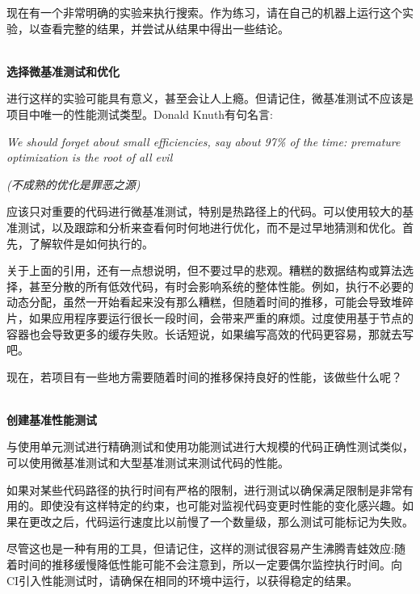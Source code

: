 现在有一个非常明确的实验来执行搜索。作为练习，请在自己的机器上运行这个实验，以查看完整的结果，并尝试从结果中得出一些结论。

\hspace*{\fill} \\ %
\noindent
\textbf{选择微基准测试和优化}

进行这样的实验可能具有意义，甚至会让人上瘾。但请记住，微基准测试不应该是项目中唯一的性能测试类型。Donald Knuth有句名言:

\begin{center}
\textit{We should forget about small efficiencies, say about 97\% of the time: premature optimization is the root of all evil}

\textit{(不成熟的优化是罪恶之源)}
\end{center}

应该只对重要的代码进行微基准测试，特别是热路径上的代码。可以使用较大的基准测试，以及跟踪和分析来查看何时何地进行优化，而不是过早地猜测和优化。首先，了解软件是如何执行的。

\begin{tcolorbox}[colback=blue!5!white,colframe=blue!75!black, title=Note]
\hspace*{0.7cm}关于上面的引用，还有一点想说明，但不要过早的悲观。糟糕的数据结构或算法选择，甚至分散的所有低效代码，有时会影响系统的整体性能。例如，执行不必要的动态分配，虽然一开始看起来没有那么糟糕，但随着时间的推移，可能会导致堆碎片，如果应用程序要运行很长一段时间，会带来严重的麻烦。过度使用基于节点的容器也会导致更多的缓存失败。长话短说，如果编写高效的代码更容易，那就去写吧。
\end{tcolorbox}

现在，若项目有一些地方需要随着时间的推移保持良好的性能，该做些什么呢？

\hspace*{\fill} \\ %
\noindent
\textbf{创建基准性能测试}

与使用单元测试进行精确测试和使用功能测试进行大规模的代码正确性测试类似，可以使用微基准测试和大型基准测试来测试代码的性能。

如果对某些代码路径的执行时间有严格的限制，进行测试以确保满足限制是非常有用的。即使没有这样特定的约束，也可能对监视代码变更时性能的变化感兴趣。如果在更改之后，代码运行速度比以前慢了一个数量级，那么测试可能标记为失败。

尽管这也是一种有用的工具，但请记住，这样的测试很容易产生沸腾青蛙效应:随着时间的推移缓慢降低性能可能不会注意到，所以一定要偶尔监控执行时间。向CI引入性能测试时，请确保在相同的环境中运行，以获得稳定的结果。


